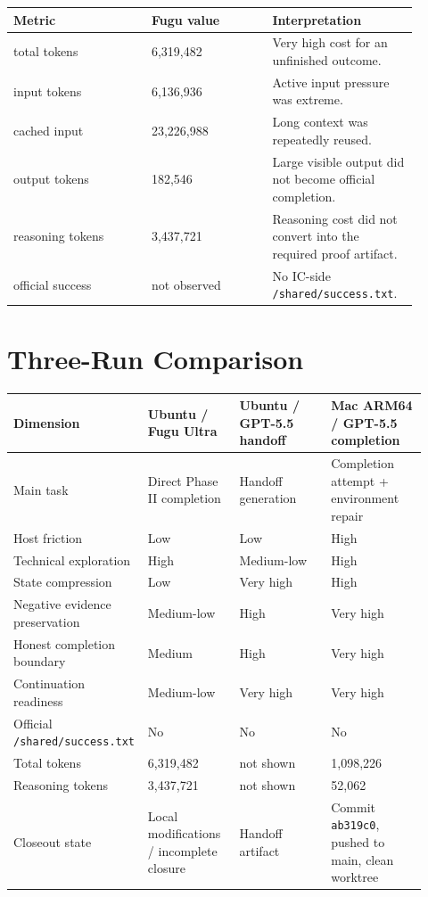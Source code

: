 \documentclass[a4paper,11pt]{article}
\newcommand{\code}[1]{\texttt{#1}}
\newcommand{\artifact}[1]{\texttt{#1}}
\begin{document}
\begin{longtable}{L{0.32\linewidth} L{0.28\linewidth} L{0.30\linewidth}}
\toprule
Metric & Fugu value & Interpretation\\
\midrule
total tokens & 6,319,482 & Very high cost for an unfinished outcome.\\
input tokens & 6,136,936 & Active input pressure was extreme.\\
cached input & 23,226,988 & Long context was repeatedly reused.\\
output tokens & 182,546 & Large visible output did not become official completion.\\
reasoning tokens & 3,437,721 & Reasoning cost did not convert into the required proof artifact.\\
official success & not observed & No IC-side \artifact{/shared/success.txt}.\\
\bottomrule
\end{longtable}

\section{Three-Run Comparison}

\begin{longtable}{L{0.25\linewidth} L{0.22\linewidth} L{0.22\linewidth} L{0.23\linewidth}}
\toprule
Dimension & Ubuntu / Fugu Ultra & Ubuntu / GPT-5.5 handoff & Mac ARM64 / GPT-5.5 completion\\
\midrule
Main task & Direct Phase II completion & Handoff generation & Completion attempt + environment repair\\
Host friction & Low & Low & High\\
Technical exploration & High & Medium-low & High\\
State compression & Low & Very high & High\\
Negative evidence preservation & Medium-low & High & Very high\\
Honest completion boundary & Medium & High & Very high\\
Continuation readiness & Medium-low & Very high & Very high\\
Official \artifact{/shared/success.txt} & No & No & No\\
Total tokens & 6,319,482 & not shown & 1,098,226\\
Reasoning tokens & 3,437,721 & not shown & 52,062\\
Closeout state & Local modifications / incomplete closure & Handoff artifact & Commit \code{ab319c0}, pushed to main, clean worktree\\
\bottomrule
\end{longtable}
\end{document}
